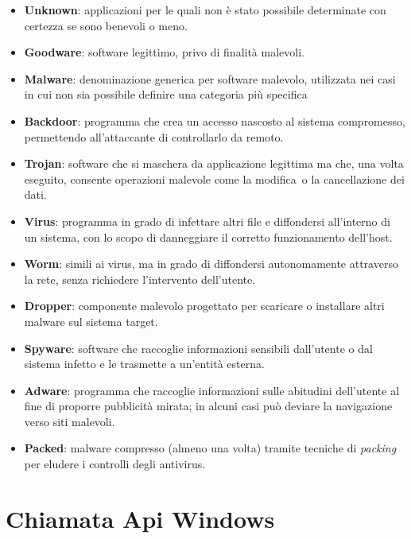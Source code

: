 \begin{itemize}
      \item \textbf{Unknown}: applicazioni per le quali non è stato possibile determinate con certezza se sono benevoli o meno.
      \item \textbf{Goodware}: software legittimo, privo di finalità malevoli.
      \item \textbf{Malware}: denominazione generica per software malevolo, utilizzata nei casi in cui non sia possibile definire una categoria più specifica
      \item \textbf{Backdoor}: programma che crea un accesso nascosto al sistema compromesso, permettendo all'attaccante di controllarlo da remoto\cite{Kaspersky-malware_backdoor}.
      \item \textbf{Trojan}: software che si maschera da applicazione legittima ma che, una volta eseguito, consente operazioni malevole come la modifica\
            o la cancellazione dei dati\cite{Cisco-Malware_Taxonomy}.
      \item \textbf{Virus}: programma in grado di infettare altri file e diffondersi all'interno di un sistema, con lo scopo di danneggiare il corretto funzionamento dell'host\cite{Cisco-Malware_Taxonomy}.
      \item \textbf{Worm}:  simili ai virus, ma in grado di diffondersi autonomamente attraverso la rete, senza richiedere l'intervento dell'utente\cite{Cisco-Malware_Taxonomy}.
      \item \textbf{Dropper}: componente malevolo progettato per scaricare o installare altri malware sul sistema target\cite{Kaspersky-malware_dropper}.
      \item \textbf{Spyware}: software che raccoglie informazioni sensibili dall'utente o dal sistema infetto e le trasmette a un'entità esterna\cite{Cisco-Malware_Taxonomy}.
      \item \textbf{Adware}: programma che raccoglie informazioni sulle abitudini dell'utente al fine di proporre pubblicità mirata; in alcuni casi può deviare la navigazione verso siti malevoli\cite{Cisco-Malware_Taxonomy}.
      \item \textbf{Packed}: malware compresso (almeno una volta) tramite tecniche di \textit{packing} per eludere i controlli degli antivirus\cite{Kaspersky-malware_MultiPacked}.
\end{itemize}

\section{Chiamata Api Windows}

